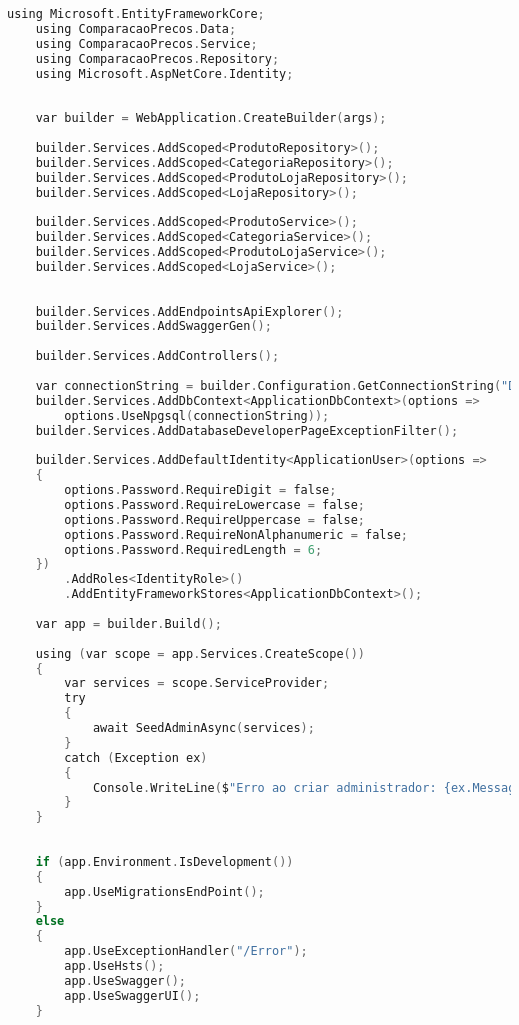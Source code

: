\documentclass[12pt]{article}
\begin{document}
\begin{lstlisting}[language=C,caption={Program.cs}]
    using Microsoft.EntityFrameworkCore;
    using ComparacaoPrecos.Data;
    using ComparacaoPrecos.Service;
    using ComparacaoPrecos.Repository;
    using Microsoft.AspNetCore.Identity;
    
    
    var builder = WebApplication.CreateBuilder(args);
    
    builder.Services.AddScoped<ProdutoRepository>();
    builder.Services.AddScoped<CategoriaRepository>();
    builder.Services.AddScoped<ProdutoLojaRepository>();
    builder.Services.AddScoped<LojaRepository>();
    
    builder.Services.AddScoped<ProdutoService>();
    builder.Services.AddScoped<CategoriaService>();
    builder.Services.AddScoped<ProdutoLojaService>();
    builder.Services.AddScoped<LojaService>();
    
    
    builder.Services.AddEndpointsApiExplorer();
    builder.Services.AddSwaggerGen();
    
    builder.Services.AddControllers();
    
    var connectionString = builder.Configuration.GetConnectionString("DefaultConnection") ?? throw new InvalidOperationException("Connection string 'DefaultConnection' not found.");
    builder.Services.AddDbContext<ApplicationDbContext>(options =>
        options.UseNpgsql(connectionString));
    builder.Services.AddDatabaseDeveloperPageExceptionFilter();
    
    builder.Services.AddDefaultIdentity<ApplicationUser>(options =>
    {
        options.Password.RequireDigit = false; 
        options.Password.RequireLowercase = false;
        options.Password.RequireUppercase = false;
        options.Password.RequireNonAlphanumeric = false;
        options.Password.RequiredLength = 6;
    })
        .AddRoles<IdentityRole>() 
        .AddEntityFrameworkStores<ApplicationDbContext>();
    
    var app = builder.Build();
    
    using (var scope = app.Services.CreateScope())
    {
        var services = scope.ServiceProvider;
        try
        {
            await SeedAdminAsync(services);
        }
        catch (Exception ex)
        {
            Console.WriteLine($"Erro ao criar administrador: {ex.Message}");
        }
    }
    
    
    if (app.Environment.IsDevelopment())
    {
        app.UseMigrationsEndPoint();
    }
    else
    {
        app.UseExceptionHandler("/Error");
        app.UseHsts();
        app.UseSwagger();
        app.UseSwaggerUI();
    }
    

\end{lstlisting}
\end{document}
